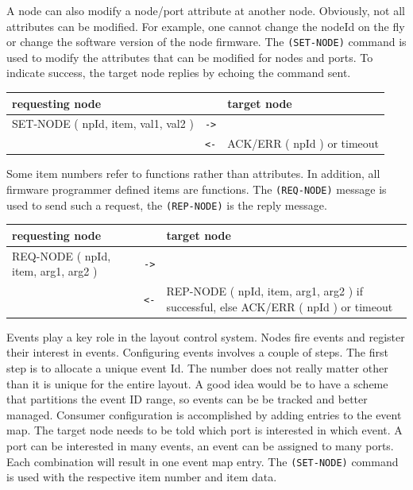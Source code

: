 A node can also modify a node/port attribute at another node. Obviously, not all attributes can be modified. For example, one cannot change the nodeId on the fly or change the software version of the node firmware. The \texttt{(SET-NODE)} command is used to modify the attributes that can be modified for nodes and ports. To indicate success, the target node replies by echoing the command sent.

\begin{table}[ht!]
    \begin{center}
        \begin{tabular}{|p{}| c |p{}|}
            \toprule
            \textbf{requesting node} & & \textbf{ target node} \\
            \midrule
            SET-NODE ( npId, item, val1, val2 ) & \texttt{->} &  \\
            \midrule
            & \texttt {<-} & ACK/ERR ( npId ) or timeout \\
            \bottomrule
        \end{tabular}
    \end{center}
\end{table}

Some item numbers refer to functions rather than attributes. In addition, all firmware programmer defined items are functions.  The \texttt{(REQ-NODE)} message is used to send such a request, the \texttt{(REP-NODE)} is the reply message.

\begin{table}[ht!]
    \begin{center}
        \begin{tabular}{|p{}| c |p{}|}
            \toprule
            \textbf{requesting node} & & \textbf{ target node} \\
            \midrule
            REQ-NODE ( npId, item, arg1, arg2 ) & \texttt{->} &  \\
            \midrule
            & \texttt{<-} & REP-NODE ( npId, item, arg1, arg2 ) if successful, else ACK/ERR ( npId ) or timeout \\
            \bottomrule
        \end{tabular}
    \end{center}
\end{table}


Events play a key role in the layout control system. Nodes fire events and register their interest in events. Configuring events involves a couple of steps. The first step is to allocate a unique event Id. The number does not really matter other than it is unique for the entire layout. A good idea would be to have a scheme that partitions the event ID range, so events can be be tracked and better managed. Consumer configuration is accomplished by adding entries to the event map. The target node needs to be told which port is interested in which event. A port can be interested in many events, an event can be assigned to many ports. Each combination will result in one event map entry. The \texttt{(SET-NODE)} command is used with the respective item number and item data.

